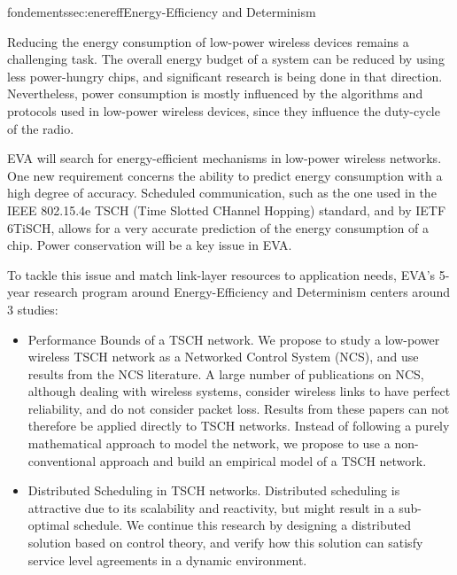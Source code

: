 \documentclass{ra2016}
\begin{document}
\begin{module}{fondements}{sec:enereff}{Energy-Efficiency and Determinism}

Reducing the energy consumption of low-power wireless devices remains a challenging task.
The overall energy budget of a system can be reduced by using less power-hungry chips, and significant research is being done in that direction. 
Nevertheless, power consumption is mostly influenced by the algorithms and protocols used in low-power wireless devices, since they influence the duty-cycle of the radio.

EVA will search for energy-efficient mechanisms in low-power wireless networks.
One new requirement concerns the ability to predict energy consumption with a high degree of accuracy.
Scheduled communication, such as the one used in the IEEE 802.15.4e TSCH (Time Slotted CHannel Hopping) standard, and by IETF 6TiSCH, allows for a very accurate prediction of the energy consumption of a chip. Power conservation will be a key issue in EVA.

To tackle this issue and match link-layer resources to application needs, EVA's 5-year research program around Energy-Efficiency and Determinism centers around 3 studies:

\begin{itemize}
    \item Performance Bounds of a TSCH network.
        We propose to study a low-power wireless TSCH network as a Networked Control System (NCS), and use results from the NCS literature.
        A large number of publications on NCS, although dealing with wireless systems, consider wireless links to have perfect reliability, and do not consider packet loss.
        Results from these papers can not therefore be applied directly to TSCH networks.
        Instead of following a purely mathematical approach to model the network, we propose to use a non-conventional approach and build an empirical model of a TSCH network.
    \item Distributed Scheduling in TSCH networks.
       Distributed scheduling is attractive due to its scalability and reactivity, but might result in a sub-optimal schedule.
       We continue this research by designing a distributed solution based on control theory, and verify how this solution can satisfy service level agreements in a dynamic environment.
\end{itemize}

\end{module}
\end{document}
